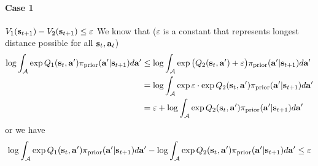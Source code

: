 \paragraph{Case 1} $V_1(\bold{s}_{t+1}) - V_2(\bold{s}_{t+1}) \le \varepsilon$ We know that ($\varepsilon$ is a constant that represents longest distance possible for all $\bold{s}_t, \bold{a}_t$)
\begin{equation}
    \begin{aligned}
        \log \int_{\mathcal{A}} \exp Q_1(\bold{s}_t, \bold{a}') \pi_{\text{prior}} (\bold{a}' | \bold{s}_{t+1}) d\bold{a}' &\le \log \int_{\mathcal{A}} \exp \big(Q_2(\bold{s}_t, \bold{a}') + \varepsilon \big) \pi_{\text{prior}} (\bold{a}' | \bold{s}_{t+1}) d\bold{a}' \\ 
        &= \log \int_{\mathcal{A}} \exp \varepsilon \cdot \exp Q_2(\bold{s}_t, \bold{a}') \pi_{\text{prior}} (\bold{a}' | \bold{s}_{t+1}) d\bold{a}' \\ 
        &= \varepsilon + \log \int_{\mathcal{A}} \exp Q_2(\bold{s}_t, \bold{a}') \pi_{\text{prior}} (\bold{a}' | \bold{s}_{t+1}) d\bold{a}'
    \end{aligned}
\end{equation}
or we have 
\begin{equation}
\log \int_{\mathcal{A}} \exp Q_1(\bold{s}_t, \bold{a}') \pi_{\text{prior}} (\bold{a}' | \bold{s}_{t+1}) d\bold{a}' - \log \int_{\mathcal{A}} \exp Q_2(\bold{s}_t, \bold{a}') \pi_{\text{prior}} (\bold{a}' | \bold{s}_{t+1}) d\bold{a}' \le \varepsilon
\end{equation}
